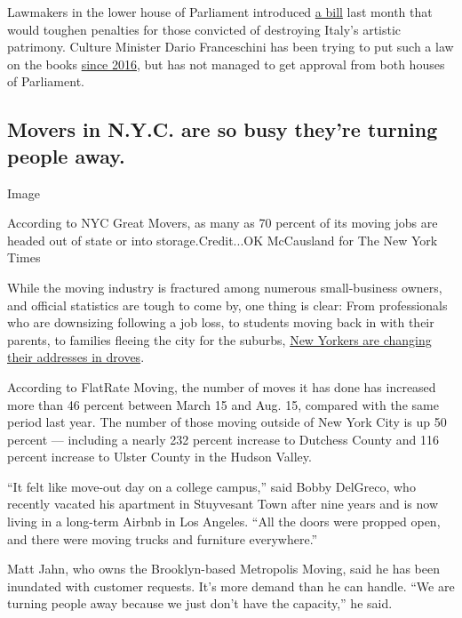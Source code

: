Lawmakers in the lower house of Parliament introduced
\href{http://documenti.camera.it/leg18/pdl/pdf/leg.18.pdl.camera.2571.18PDL0107250.pdf}{a
bill} last month that would toughen penalties for those convicted of
destroying Italy's artistic patrimony. Culture Minister Dario
Franceschini has been trying to put such a law on the books
\href{https://storico.beniculturali.it/mibac/export/MiBAC/sito-MiBAC/Contenuti/MibacUnif/Comunicati/visualizza_asset.html_1253809747.html}{since
2016}, but has not managed to get approval from both houses of
Parliament.

\hypertarget{movers-in-nyc-are-so-busy-theyre-turning-people-away}{%
\subsection{Movers in N.Y.C. are so busy they're turning people
away.}\label{movers-in-nyc-are-so-busy-theyre-turning-people-away}}

Image

According to NYC Great Movers, as many as 70 percent of its moving jobs
are headed out of state or into storage.Credit...OK McCausland for The
New York Times

While the moving industry is fractured among numerous small-business
owners, and official statistics are tough to come by, one thing is
clear: From professionals who are downsizing following a job loss, to
students moving back in with their parents, to families fleeing the city
for the suburbs,
\href{https://www.nytimes3xbfgragh.onion/2020/08/20/nyregion/moving-new-york-coronavirus.html}{New
Yorkers are changing their addresses in droves}.

According to FlatRate Moving, the number of moves it has done has
increased more than 46 percent between March 15 and Aug. 15, compared
with the same period last year. The number of those moving outside of
New York City is up 50 percent --- including a nearly 232 percent
increase to Dutchess County and 116 percent increase to Ulster County in
the Hudson Valley.

``It felt like move-out day on a college campus,'' said Bobby DelGreco,
who recently vacated his apartment in Stuyvesant Town after nine years
and is now living in a long-term Airbnb in Los Angeles. ``All the doors
were propped open, and there were moving trucks and furniture
everywhere.''

Matt Jahn, who owns the Brooklyn-based Metropolis Moving, said he has
been inundated with customer requests. It's more demand than he can
handle. ``We are turning people away because we just don't have the
capacity,'' he said.

